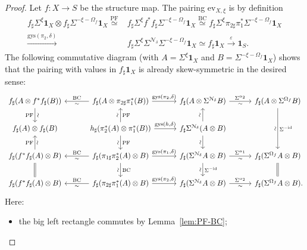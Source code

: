 \documentclass{amsart}
\numberwithin{equation}{section}
\theoremstyle{plain}
\theoremstyle{definition}
\let\scr=\mathcal
\def\1{\mathbf 1}
\def\id{\mathrm{id}}
\def\ev{\mathrm{ev}}
\let\epsilon=\varepsilon
\begin{document}
\begin{proof}
	Let $f\colon X\to S$ be the structure map.
	The pairing $\ev_{X,\xi}$ is by definition
	\begin{align*}
	f_\sharp\Sigma^\xi\1_X\otimes f_\sharp\Sigma^{-\xi-\Omega_f}\1_X \overset{\mathrm{PF}}{\simeq} & f_\sharp \Sigma^\xi f^*f_\sharp\Sigma^{-\xi-\Omega_f}\1_X
	\overset{\mathrm{BC}}{\simeq} f_\sharp\Sigma^\xi\pi_{2\sharp}\pi_1^*\Sigma^{-\xi-\Omega_f}\1_X \\
	 \xrightarrow{\mathrm{gys}(\pi_2,\delta)} & f_\sharp\Sigma^{\xi}\Sigma^{\scr N_\delta}\Sigma^{-\xi-\Omega_f}\1_X
	 \simeq f_\sharp\1_X \xrightarrow{\epsilon} \1_S.
	\end{align*}
	The following commutative diagram (with $A=\Sigma^\xi\1_X$ and $B=\Sigma^{-\xi-\Omega_f}\1_X$) shows that the pairing with values in $f_\sharp\1_X$ is already skew-symmetric in the desired sense:
	\[
	\begin{tikzcd}[column sep=3em]
	f_\sharp(A\otimes f^*f_\sharp(B)) \ar{d}[sloped]{\sim}[swap]{\mathrm{PF}} \ar[<-]{r}{\mathrm{BC}}[swap]{\sim} & f_\sharp(A\otimes \pi_{2\sharp}\pi_1^*(B)) \ar{r}{\mathrm{gys}(\pi_2,\delta)} & f_\sharp(A\otimes \Sigma^{\scr N_\delta}B) \ar{r}{\Sigma^{\alpha_2}}[swap]{\sim} & f_\sharp(A\otimes \Sigma^{\Omega_f}B) \ar{dd}{\Sigma^{-\id}}[sloped,swap]{\sim}  \\
	f_\sharp(A)\otimes f_\sharp(B) & h_\sharp(\pi_2^*(A)\otimes \pi_1^*(B)) \ar{r}{\mathrm{gys}(h,\delta)} \ar{d}{\mathrm{PF}}[swap,sloped]{\sim} \ar{u}[sloped]{\sim}[swap]{\mathrm{PF}} & f_\sharp\Sigma^{\scr N_\delta}(A\otimes B) \ar{d}[sloped,swap]{\sim} \ar{u}[sloped]{\sim} \\
	f_\sharp(f^*f_\sharp(A)\otimes B) \ar{u}{\mathrm{PF}}[swap,sloped]{\sim} \ar[<-]{r}{\mathrm{BC}}[swap]{\sim} \ar[equal]{d} & f_\sharp(\pi_{1\sharp}\pi_2^*(A)\otimes B) \ar{r}{\mathrm{gys}(\pi_1,\delta)} \ar{d}{\mathrm{BC}}[swap,sloped]{\sim} & f_\sharp(\Sigma^{\scr N_\delta}A\otimes B) \ar{d}{\Sigma^{-\id}}[sloped,swap]{\sim} \ar{r}{\Sigma^{\alpha_1}}[swap]{\sim} & f_\sharp(\Sigma^{\Omega_f}A\otimes B) \ar[equal]{d} \\
	f_\sharp(f^*f_\sharp(A)\otimes B) \ar[<-]{r}{\mathrm{BC}}[swap]{\sim} & f_\sharp(\pi_{2\sharp}\pi_1^*(A)\otimes B) \ar{r}{\mathrm{gys}(\pi_2,\delta)} & f_\sharp(\Sigma^{\scr N_\delta}A\otimes B) \ar{r}{\Sigma^{\alpha_2}}[swap]{\sim} & f_\sharp(\Sigma^{\Omega_f}A\otimes B)\rlap.
	\end{tikzcd}
	\]
	Here:
	\begin{itemize}
		\item the big left rectangle commutes by Lemma~\ref{lem:PF-BC};

\end{itemize}
\end{proof}
\end{document}
